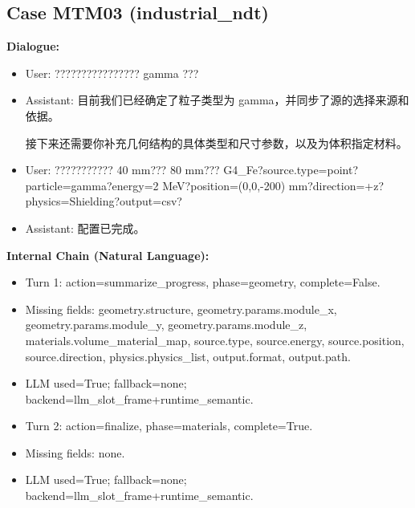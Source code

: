 \documentclass[11pt]{ctexart}
\begin{document}
\subsection{Case MTM03 (industrial\_ndt)}
\textbf{Dialogue:}
\begin{itemize}
\item User: ???????????????? gamma ???
\item Assistant: 目前我们已经确定了粒子类型为 gamma，并同步了源的选择来源和依据。

接下来还需要你补充几何结构的具体类型和尺寸参数，以及为体积指定材料。
\item User: ??????????? 40 mm??? 80 mm??? G4\_Fe?source.type=point?particle=gamma?energy=2 MeV?position=(0,0,-200) mm?direction=+z?physics=Shielding?output=csv?
\item Assistant: 配置已完成。
\end{itemize}
\textbf{Internal Chain (Natural Language):}
\begin{itemize}
\item Turn 1: action=summarize\_progress, phase=geometry, complete=False.
\item Missing fields: geometry.structure, geometry.params.module\_x, geometry.params.module\_y, geometry.params.module\_z, materials.volume\_material\_map, source.type, source.energy, source.position, source.direction, physics.physics\_list, output.format, output.path.
\item LLM used=True; fallback=none; backend=llm\_slot\_frame+runtime\_semantic.
\item Turn 2: action=finalize, phase=materials, complete=True.
\item Missing fields: none.
\item LLM used=True; fallback=none; backend=llm\_slot\_frame+runtime\_semantic.
\end{itemize}
\end{document}
